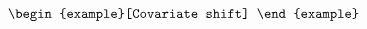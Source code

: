 \documentclass[aos,preprint]{imsart}
\begin{document}
\begin{equation}
{\begin{example}[Covariate shift]
%


\iffalse
For large enough $p$,
\begin{align*}
	\bigtr{\Sigma^{(2)} \hat{\Sigma}^{-1}} &\rightarrow \frac{1}{n_1 + n_2} \bigtr{\Sigma^{(2)} (a_1 \Sigma^{(1)} + a_2 \Sigma^{(2)})^{-1}}
	= \frac{1}{n_1 + n_2} \bigtr{(a_1 M^{\top} M + a_2 \id)^{-1}}.
\end{align*}
Hence the variance limit depends on the spectrum of $M$. %
\fi


\end{example}}
\end{equation}
\end{document}
